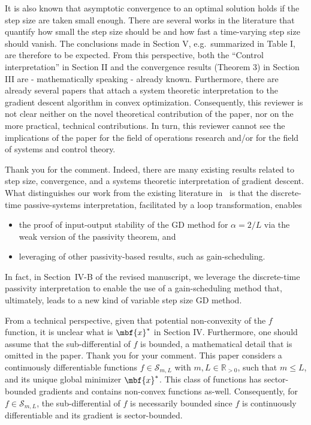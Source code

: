 \begin{rebuttal}
    {%
        It is also known that asymptotic convergence to an optimal solution holds if the step size are taken small enough. There are several works in the literature that quantify how small the step size should be and how fast a time-varying step size should vanish. The conclusions made in Section V, e.g.\ summarized in Table I,  are therefore to be expected. From this perspective, both the ``Control interpretation'' in Section II  and the convergence results (Theorem 3) in Section III are - mathematically speaking - already known. Furthermore, there are already several papers that attach a system theoretic interpretation to the gradient descent algorithm in convex optimization. Consequently, this reviewer is not clear neither on the novel theoretical contribution of the paper, nor on the more practical, technical contributions. In turn, this reviewer cannot see the implications of the paper for the field of operations research and/or for the field of systems and control theory.
    }%
    {%
        Thank you for the comment. Indeed, there are many existing results related to step size, convergence, and a systems theoretic interpretation of gradient descent. What distinguishes our work from the existing literature in~\cite{ugrinovskii,alex_petersen,hu_lessard,lessard_dissipativity,lessard_recht_iqc,seiler_iqc,simpson} is that the discrete-time passive-systems interpretation, facilitated by a loop transformation, enables 
        \begin{itemize}
            \item{%
                the proof of input-output stability of the GD method for \(\alpha = 2/L\) via the weak version of the passivity theorem, and
            }%
            \item{%
                leveraging of other passivity-based results, such as gain-scheduling.
            }%
        \end{itemize}
        In fact, in Section~IV-B of the revised manuscript, we leverage the discrete-time passivity interpretation to enable the use of a gain-scheduling method that, ultimately, leads to a new kind of variable step size GD method.
    }%
\end{rebuttal}
\begin{rebuttal}
    {%
    From a technical perspective, given that potential non-convexity of the $f$ function, it is unclear what is $\mbf{x}^{\ast}$ in Section IV\@. Furthermore, one should assume that the sub-differential of $f$ is bounded, a mathematical detail that is omitted in the paper.
    }%
    {%
        Thank you for your comment. This paper considers a continuously differentiable functions \(f \in \mathcal{S}_{m, L}\) with \(m, L \in \mathbb{R}_{>0}\), such that \(m \leq L\), and its unique global minimizer \(\mbf{x}^\ast\). This class of functions has sector-bounded gradients and contains non-convex functions as-well. Consequently, for \(f \in \mathcal{S}_{m, L}\), the sub-differential of \(f\) is necessarily bounded since \(f\) is continuously differentiable and its gradient is sector-bounded.
    }%
\end{rebuttal}
